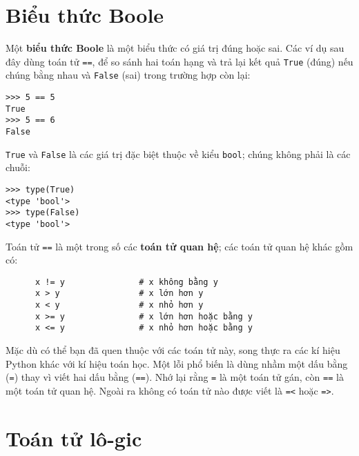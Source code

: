 \documentclass[11pt]{book}
\begin{document}
\section{Biểu thức Boole}

Một {\bf biểu thức Boole} là một biểu thức có giá trị đúng
hoặc sai. Các ví dụ sau đây dùng toán tử 
{\tt ==}, để so sánh hai toán hạng và 
trả lại kết quả {\tt True} (đúng) nếu chúng bằng nhau và {\tt False} 
(sai) trong trường hợp còn lại:

\beforeverb
\begin{verbatim}
>>> 5 == 5
True
>>> 5 == 6
False
\end{verbatim}
\afterverb
%
{\tt True} và {\tt False} là các giá trị đặc biệt thuộc về kiểu 
{\tt bool}; chúng không phải là các chuỗi:


\beforeverb
\begin{verbatim}
>>> type(True)
<type 'bool'>
>>> type(False)
<type 'bool'>
\end{verbatim}
\afterverb
%
Toán tử {\tt ==} là một trong số các {\bf toán tử quan hệ}; các
toán tử quan hệ khác gồm có:

\beforeverb
\begin{verbatim}
      x != y               # x không bằng y
      x > y                # x lớn hơn y
      x < y                # x nhỏ hơn y
      x >= y               # x lớn hơn hoặc bằng y
      x <= y               # x nhỏ hơn hoặc bằng y
\end{verbatim}
\afterverb
%

Mặc dù có thể bạn đã quen thuộc với các toán tử này, song thực ra 
các kí hiệu Python khác với kí hiệu toán học. Một lỗi phổ biến là 
dùng nhầm một dấu bằng ({\tt =}) thay vì viết hai dấu bằng
({\tt ==}).  Nhớ lại rằng {\tt =} là một toán tử gán, còn 
{\tt ==} là một toán tử quan hệ. Ngoài ra không có toán tử nào 
được viết là {\tt =<} hoặc {\tt =>}.



\section {Toán tử lô-gic}
\end{document}
